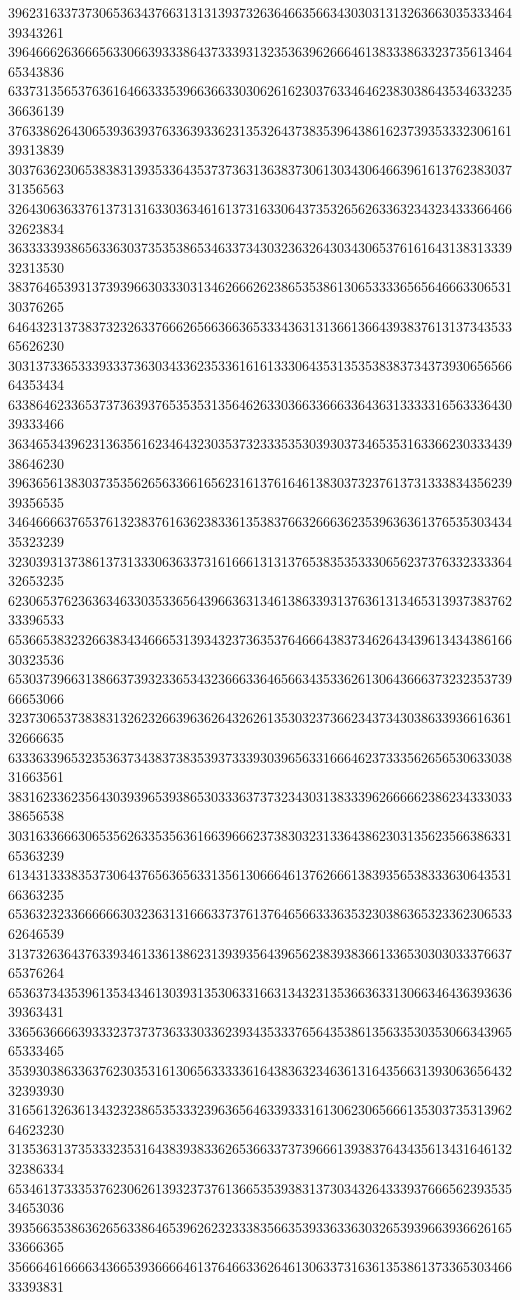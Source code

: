 39623163373730653634376631313139373263646635663430303131326366303533346439343261
39646662636665633066393338643733393132353639626664613833386332373561346465343836
63373135653763616466333539663663303062616230376334646238303864353463323536636139
37633862643065393639376336393362313532643738353964386162373935333230616139313839
30376362306538383139353364353737363136383730613034306466396161376238303731356563
32643063633761373131633036346161373163306437353265626336323432343336646632623834
36333339386563363037353538653463373430323632643034306537616164313831333932313530
38376465393137393966303330313462666262386535386130653333656564666330653130376265
64643231373837323263376662656636636533343631313661366439383761313734353365626230
30313733653339333736303433623533616161333064353135353838373437393065656664353434
63386462336537373639376535353135646263303663366633643631333331656333643039333466
36346534396231363561623464323035373233353530393037346535316336623033343938646230
39636561383037353562656336616562316137616461383037323761373133383435623939356535
34646666376537613238376163623833613538376632666362353963636137653530343435323239
32303931373861373133306363373161666131313765383535333065623737633233336432653235
62306537623636346330353365643966363134613863393137636131346531393738376233396533
65366538323266383434666531393432373635376466643837346264343961343438616630323536
65303739663138663739323365343236663364656634353362613064366637323235373966653066
32373065373838313262326639636264326261353032373662343734303863393661636132666635
63336339653235363734383738353937333930396563316664623733356265653063303831663561
38316233623564303939653938653033363737323430313833396266666238623433303338656538
30316336663065356263353563616639666237383032313364386230313562356638633165363239
61343133383537306437656365633135613066646137626661383935653833363064353166363235
65363232336666663032363131666337376137646566333635323038636532336230653362646539
31373263643763393461336138623139393564396562383938366133653030303337663765376264
65363734353961353434613039313530633166313432313536636331306634643639363639363431
33656366663933323737373633303362393435333765643538613563353035306634396565333465
35393038633637623035316130656333336164383632346361316435663139306365643232393930
31656132636134323238653533323963656463393331613062306566613530373531396264623230
31353631373533323531643839383362653663373739666139383764343561343164613232386334
65346137333537623062613932373761366535393831373034326433393766656239353534653036
39356635386362656338646539626232333835663539336336303265393966393662616533666365
35666461666634366539366664613764663362646130633731636135386137336530346633393831
